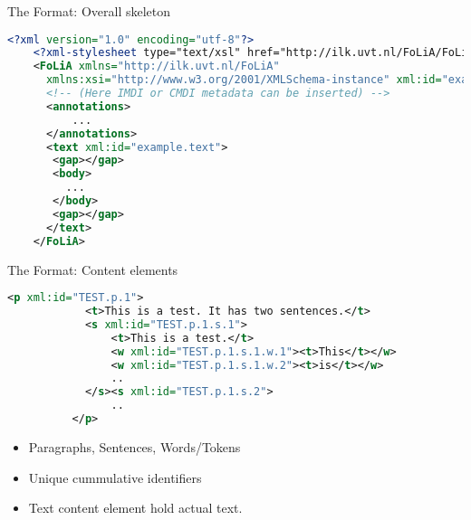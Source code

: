 \documentclass[compress]{beamer}
\begin{document}
\begin{frame}{The Format: Overall skeleton}
    \begin{lstlisting}[language=xml]
    <?xml version="1.0" encoding="utf-8"?>
    <?xml-stylesheet type="text/xsl" href="http://ilk.uvt.nl/FoLiA/FoLiA.xsl"?>
    <FoLiA xmlns="http://ilk.uvt.nl/FoLiA"
      xmlns:xsi="http://www.w3.org/2001/XMLSchema-instance" xml:id="example">
      <!-- (Here IMDI or CMDI metadata can be inserted) -->
      <annotations>
          ...
      </annotations>    
      <text xml:id="example.text">
       <gap></gap>
       <body>
         ...
       </body>
       <gap></gap>
      </text>
    </FoLiA>  
    \end{lstlisting}
\end{frame}


\begin{frame}{The Format: Content elements}
    \begin{example}
     \begin{lstlisting}[language=xml]
         <p xml:id="TEST.p.1">
            <t>This is a test. It has two sentences.</t>
            <s xml:id="TEST.p.1.s.1">        
                <t>This is a test.</t>
                <w xml:id="TEST.p.1.s.1.w.1"><t>This</t></w>
                <w xml:id="TEST.p.1.s.1.w.2"><t>is</t></w>
                ..
            </s><s xml:id="TEST.p.1.s.2">        
                ..
          </p>                
     \end{lstlisting}
    \end{example}
    \begin{block}
    \begin{itemize}
        \item Paragraphs, Sentences, Words/Tokens
        \item Unique cummulative identifiers
        \item Text content element hold actual text.
    \end{itemize}
    \end{block}
\end{frame}
\end{document}

